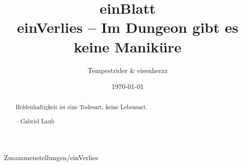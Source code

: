 \documentclass[11pt,a4paper]{scrreprt}
\date{\today}
\author{Tempestrider \& eisenherzz}
\title{\pik \karo einBlatt\herz \kreuz \\
einVerlies -- Im Dungeon gibt es keine Maniküre}
\begin{document}
\maketitle

\begin{abstract}
Heldenhaftigkeit ist eine Todesart, keine Lebensart.

-- Gabriel Laub

\end{abstract}




\tableofcontents

 {Zusammenstellungen/einVerlies}

\listoftables


\end{document}
